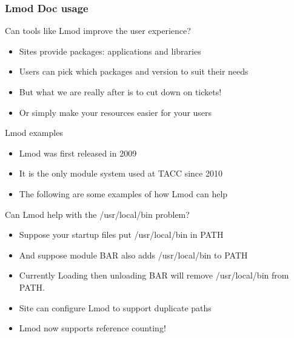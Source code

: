 \documentclass{beamer}
\begin{document}
\begin{frame}[fragile]
    \frametitle{Lmod Doc usage}
\end{frame}


\begin{frame}{Can tools like Lmod improve the user experience?}
  \begin{itemize}
    \item Sites provide packages: applications and libraries
    \item Users can pick which packages and version to suit their needs
    \item But what we are really after is to cut down on tickets!
    \item Or simply make your resources easier for your users
  \end{itemize}
\end{frame}

\begin{frame}{Lmod examples}
  \begin{itemize}
    \item Lmod was first released in 2009
    \item It is the only module system used at TACC since 2010
    \item The following are some examples of how Lmod can help
  \end{itemize}
\end{frame}

\begin{frame}{Can Lmod help with the /usr/local/bin problem?}
  \begin{itemize}
    \item Suppose your startup files put /usr/local/bin in PATH
    \item And suppose module BAR also adds /usr/local/bin to PATH
    \item Currently Loading then unloading BAR will remove
      /usr/local/bin from PATH. 
    \item Site can configure Lmod to support duplicate paths
    \item Lmod now supports reference counting!
  \end{itemize}
\end{frame}
\end{document}
